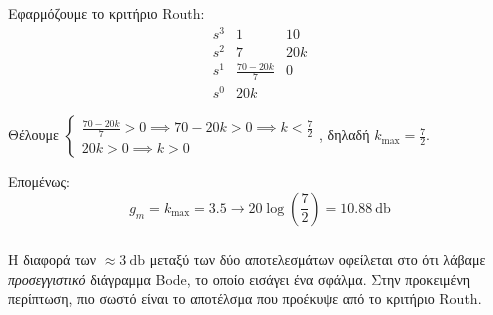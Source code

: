 \documentclass[11pt,a4paper,notitlepage,fleqn,final]{article}
\begin{document}
\begin{exercise}
\begin{enumgreekparen}
	Εφαρμόζουμε το κριτήριο Routh:
	\[
	\begin{array}{r|cc}
	s^3&1&10 \\
	s^2&7&20k \\
	s^1 & \frac{70-20k}{7} & 0\\
	s^0 & 20k
	\end{array}
	\]
	
	Θέλουμε \(
		\begin{cases}
		\frac{70-20k}{7}> 0 \implies 70-20k > 0 \implies k<\frac{7}{2}\\
		20k > 0 \implies k>0
		\end{cases}
	\), δηλαδή \( k_{\max} = \frac{7}{2} \).
	
	Επομένως:
	\[
	g_m = k_{\max} = 3.5 \to 20\log\left( \frac{7}{2} \right) = \SI{10.88}{\decibel}
	\]
	
	\subparagraph{}
	Η διαφορά των \( \approx \SI{3}{\decibel} \) μεταξύ των δύο αποτελεσμάτων οφείλεται στο ότι
	λάβαμε \textit{προσεγγιστικό} διάγραμμα Bode, το οποίο εισάγει ένα σφάλμα. Στην προκειμένη
	περίπτωση, πιο σωστό είναι το αποτέλσμα που προέκυψε από το κριτήριο Routh.
\end{enumgreekparen}

\hspace{0pt}

\end{exercise}
\end{document}
